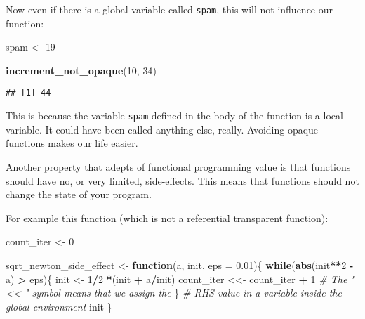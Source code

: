 \documentclass[
]{article}
\newenvironment{Shaded}{\begin{snugshade}}{\end{snugshade}}
\newcommand{\CommentTok}[1]{\textcolor[rgb]{0.56,0.35,0.01}{\textit{#1}}}
\newcommand{\ControlFlowTok}[1]{\textcolor[rgb]{0.13,0.29,0.53}{\textbf{#1}}}
\newcommand{\DataTypeTok}[1]{\textcolor[rgb]{0.13,0.29,0.53}{#1}}
\newcommand{\DecValTok}[1]{\textcolor[rgb]{0.00,0.00,0.81}{#1}}
\newcommand{\FloatTok}[1]{\textcolor[rgb]{0.00,0.00,0.81}{#1}}
\newcommand{\KeywordTok}[1]{\textcolor[rgb]{0.13,0.29,0.53}{\textbf{#1}}}
\newcommand{\NormalTok}[1]{#1}
\newcommand{\OperatorTok}[1]{\textcolor[rgb]{0.81,0.36,0.00}{\textbf{#1}}}
\newcommand{\StringTok}[1]{\textcolor[rgb]{0.31,0.60,0.02}{#1}}
\begin{document}
Now even if there is a global variable called \texttt{spam}, this will not influence our function:

\begin{Shaded}
\begin{Highlighting}[]
\NormalTok{spam \textless{}{-}}\StringTok{ }\DecValTok{19}

\KeywordTok{increment\_not\_opaque}\NormalTok{(}\DecValTok{10}\NormalTok{, }\DecValTok{34}\NormalTok{)}
\end{Highlighting}
\end{Shaded}

\begin{verbatim}
## [1] 44
\end{verbatim}

This is because the variable \texttt{spam} defined in the body of the function is a local variable. It
could have been called anything else, really. Avoiding opaque functions makes our life easier.

Another property that adepts of functional programming value is that functions should have no, or
very limited, side-effects. This means that functions should not change the state of your program.

For example this function (which is not a referential transparent function):

\begin{Shaded}
\begin{Highlighting}[]
\NormalTok{count\_iter \textless{}{-}}\StringTok{ }\DecValTok{0}

\NormalTok{sqrt\_newton\_side\_effect \textless{}{-}}\StringTok{ }\ControlFlowTok{function}\NormalTok{(a, init, }\DataTypeTok{eps =} \FloatTok{0.01}\NormalTok{)\{}
    \ControlFlowTok{while}\NormalTok{(}\KeywordTok{abs}\NormalTok{(init}\OperatorTok{**}\DecValTok{2} \OperatorTok{{-}}\StringTok{ }\NormalTok{a) }\OperatorTok{\textgreater{}}\StringTok{ }\NormalTok{eps)\{}
\NormalTok{        init \textless{}{-}}\StringTok{ }\DecValTok{1}\OperatorTok{/}\DecValTok{2} \OperatorTok{*}\NormalTok{(init }\OperatorTok{+}\StringTok{ }\NormalTok{a}\OperatorTok{/}\NormalTok{init)}
\NormalTok{        count\_iter \textless{}\textless{}{-}}\StringTok{ }\NormalTok{count\_iter }\OperatorTok{+}\StringTok{ }\DecValTok{1} \CommentTok{\# The "\textless{}\textless{}{-}" symbol means that we assign the}
\NormalTok{    \}                                 }\CommentTok{\# RHS value in a variable inside the global environment}
\NormalTok{    init}
\NormalTok{\}}
\end{Highlighting}
\end{Shaded}
\end{document}
